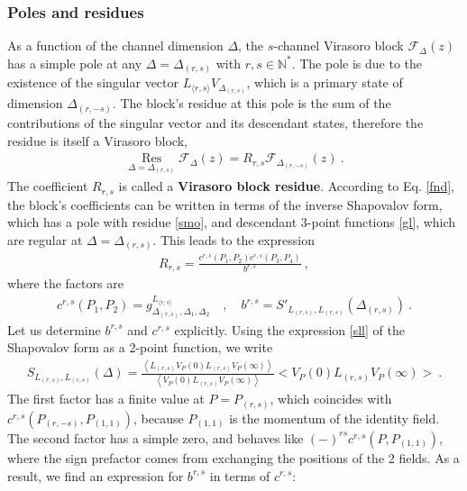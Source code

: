 \documentclass[12pt, a4paper]{article}
\newcommand{\myindex}[1]{\textbf{\boldmath #1}}
\begin{document}
\subsubsection{Poles and residues}

As a function of the channel dimension $\Delta$, the $s$-channel Virasoro block $\mathcal{F}_\Delta(z)$ has a simple pole at any $\Delta=\Delta_{(r,s)}$ with $r,s\in\mathbb{N}^*$. 
The pole is due to the existence of the singular vector $L_{\langle r,s\rangle}V_{\Delta_{(r,s)}}$, which is a primary state of dimension $\Delta_{(r,-s)}$. The block's residue at this pole is the sum of the contributions of the singular vector and its descendant states, therefore the residue is itself a Virasoro block,
\begin{align}
 \boxed{\underset{\Delta=\Delta_{(r,s)}}{\operatorname{Res}} \mathcal{F}_\Delta(z) = R_{r,s}\mathcal{F}_{\Delta_{(r,-s)}}(z)}\ .
 \label{resf}
\end{align}
The coefficient $R_{r,s}$ is called a \myindex{Virasoro block residue}. 
According to Eq. \eqref{fnd}, the block's coefficients can be written in terms of the inverse Shapovalov form, which has a pole with residue \eqref{smo}, and descendant 3-point functions \eqref{gl}, which are regular at $\Delta=\Delta_{(r,s)}$. This leads to the expression \begin{align}
\boxed{R_{r,s} = \frac{c^{r,s}(P_1,P_2)c^{r,s}(P_3,P_4)}{b^{r,s}}}\ , 
 \label{rrs}
\end{align}
where the factors are 
\begin{align}
 c^{r,s}(P_1,P_2) = g^{L_{\langle r,s\rangle}}_{\Delta_{(r,s)},\Delta_1,\Delta_2} \quad , \quad b^{r,s} =
 S'_{L_{(r,s)},L_{(r,s)}}(\Delta_{(r,s)})\ .
\end{align}
Let us determine $b^{r,s}$ and $c^{r,s}$ explicitly.
Using the expression \eqref{sll} of the Shapovalov form as a 2-point function, we write
\begin{align}
 S_{L_{(r,s)},L_{(r,s)}}(\Delta) = \frac{ \left<L_{(r,s)}V_P(0)L_{(r,s)}V_P(\infty)\right>}{\left<V_P(0)L_{(r,s)}V_P(\infty)\right>} \Big<V_P(0)L_{(r,s)}V_P(\infty)\Big> \ . 
\end{align}
The first factor has a finite value at $P=P_{(r,s)}$, which coincides with $c^{r,s}(P_{(r,-s)},P_{(1,1)})$, because $P_{(1,1)}$ is the momentum of the identity field. The second factor has a simple zero, and behaves like $(-)^{rs} c^{r,s}(P, P_{(1,1)})$, where the sign prefactor comes from exchanging the positions of the 2 fields. As a result, we find an expression for $b^{r,s}$ in terms of $c^{r,s}$:
\end{document}
